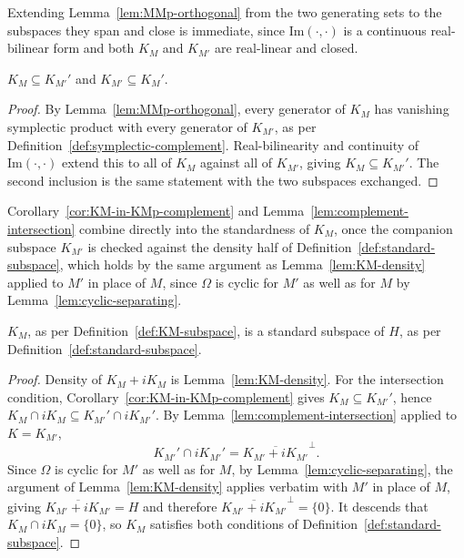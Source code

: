 \noindent Extending Lemma~\ref{lem:MMp-orthogonal} from the two generating sets to the subspaces they span and close is immediate, since $\mathrm{Im}(\cdot,\cdot)$ is a continuous real-bilinear form and both $K_M$ and $K_{M'}$ are real-linear and closed.

\begin{corollary}\label{cor:KM-in-KMp-complement}
	$K_M \subseteq K_{M'}'$ and $K_{M'} \subseteq K_M'$.
\end{corollary}

\begin{proof}
	By Lemma~\ref{lem:MMp-orthogonal}, every generator of $K_M$ has vanishing symplectic product with every generator of $K_{M'}$, as per Definition~\ref{def:symplectic-complement}. Real-bilinearity and continuity of $\mathrm{Im}(\cdot,\cdot)$ extend this to all of $K_M$ against all of $K_{M'}$, giving $K_M \subseteq K_{M'}'$. The second inclusion is the same statement with the two subspaces exchanged.
\end{proof}

Corollary~\ref{cor:KM-in-KMp-complement} and Lemma~\ref{lem:complement-intersection} combine directly into the standardness of $K_M$, once the companion subspace $K_{M'}$ is checked against the density half of Definition~\ref{def:standard-subspace}, which holds by the same argument as Lemma~\ref{lem:KM-density} applied to $M'$ in place of $M$, since $\Omega$ is cyclic for $M'$ as well as for $M$ by Lemma~\ref{lem:cyclic-separating}.

\begin{proposition}[$K_M$ is standard]\label{prop:KM-standard}
	$K_M$, as per Definition~\ref{def:KM-subspace}, is a standard subspace of $H$, as per Definition~\ref{def:standard-subspace}.
\end{proposition}

\begin{proof}
	Density of $K_M + iK_M$ is Lemma~\ref{lem:KM-density}. For the intersection condition, Corollary~\ref{cor:KM-in-KMp-complement} gives $K_M \subseteq K_{M'}'$, hence $K_M \cap iK_M \subseteq K_{M'}' \cap iK_{M'}'$. By Lemma~\ref{lem:complement-intersection} applied to $K = K_{M'}$,
	\[
	K_{M'}' \cap iK_{M'}' = \overline{K_{M'} + iK_{M'}}^{\perp}.
	\]
	Since $\Omega$ is cyclic for $M'$ as well as for $M$, by Lemma~\ref{lem:cyclic-separating}, the argument of Lemma~\ref{lem:KM-density} applies verbatim with $M'$ in place of $M$, giving $\overline{K_{M'}+iK_{M'}} = H$ and therefore $\overline{K_{M'}+iK_{M'}}^{\perp} = \{0\}$. It descends that $K_M \cap iK_M = \{0\}$, so $K_M$ satisfies both conditions of Definition~\ref{def:standard-subspace}.
\end{proof}

